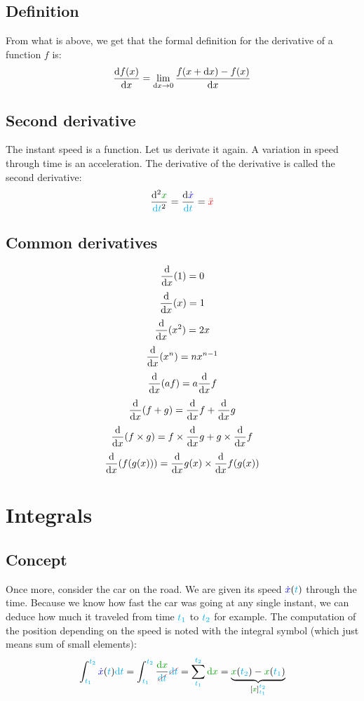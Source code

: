\subsection{Definition}

From what is above, we get that the formal definition for the derivative
of a function $f$ is:
\[
\frac {\mathrm{d} f(x)} {\mathrm{d} x}
= \lim_{\mathrm{d} x \rightarrow 0} \frac {f(x+\mathrm{d} x) - f(x)} {\mathrm{d} x}
\]


\subsection{Second derivative}

The instant speed is a function. Let us derivate it again. A variation in
speed through time is an acceleration.  The derivative of the derivative
is called the second derivative: \[
\frac {\d^2 \dist{x}} {\delay{\dt}^2}
= \frac {\d \speed{\dot x}} {\delay{\dt}}
= \accel{\ddot x}
\]


\subsection{Common derivatives}

\[
\frac {\mathrm{d}} {\mathrm{d} x} (1)   = 0
\]
\[
\frac {\mathrm{d}} {\mathrm{d} x} (x)   = 1
\]
\[
\frac {\mathrm{d}} {\mathrm{d} x} (x^2) = 2x
\]
\[
\frac {\mathrm{d}} {\mathrm{d} x} (x^n) = n x^{n-1}
\]
\[
\frac {\mathrm{d}} {\mathrm{d} x} (a f)
= a \frac {\mathrm{d}} {\mathrm{d} x} f
\]
\[
\frac {\mathrm{d}} {\mathrm{d} x} (f + g)
= \frac {\mathrm{d}} {\mathrm{d} x} f
+ \frac {\mathrm{d}} {\mathrm{d} x} g
\]
\[
\frac {\mathrm{d}} {\mathrm{d} x} (f \times g)
= f \times \frac {\mathrm{d}} {\mathrm{d} x} g
+ g \times \frac {\mathrm{d}} {\mathrm{d} x} f
\]
\[
\frac {\mathrm{d}} {\mathrm{d} x} (f(g(x)))
= \frac {\mathrm{d}} {\mathrm{d} x} g(x)
\times \frac {\mathrm{d}} {\mathrm{d} x} f(g(x))
\]



\section{Integrals}


\subsection{Concept}

Once more, consider the car on the road. We are given its speed
$\textcolor{blue}{\dot x}(\textcolor{cyan}{t})$ through the time. Because we know how fast the
car was going at any single instant, we can deduce how much it traveled
from time $\textcolor{cyan}{t_1}$ to $\textcolor{cyan}{t_2}$ for example. The computation
of the position depending on the speed is
noted with the integral symbol (which just means sum of small elements):
\[
\int_{\delay{t_1}}^{\delay{t_2}} \speed{\dot x}(\delay{t}) \delay{\dt}
= \int_{\delay{t_1}}^{\delay{t_2}} \frac {\dist{\d x}} {\strike[red]{\delay{\dt}}} \strike[red]{\delay{\dt}}
= \sum_{\delay{t_1}}^{\delay{t_2}} \dist{\d x}
= \underbrace{
	\dist{x}(\delay{t_2}) - \dist{x}(\delay{t_1})
}_{[\dist{x}]_{\delay{t_1}}^{\delay{t_2}}}
\]


